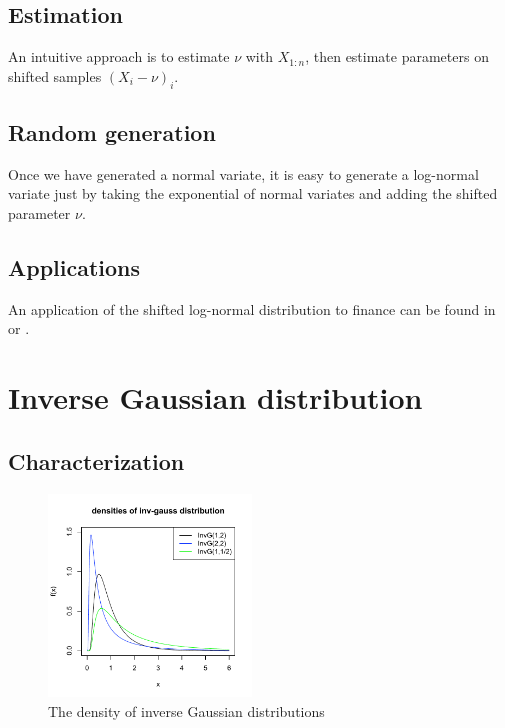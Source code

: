 \subsection{Estimation}
An intuitive approach is to estimate $\nu$ with $X_{1:n}$, then estimate parameters on shifted samples $(X_i-\nu)_i$.

\subsection{Random generation}
Once we have generated a normal variate, it is easy to generate a log-normal variate just by taking the exponential of normal variates and adding the shifted parameter $\nu$.

\subsection{Applications}
An application of the shifted log-normal distribution to finance can be found in \cite{haahtela} or
\cite{brigo}.

\section{Inverse Gaussian distribution}
\subsection{Characterization}

\begin{figure}
  \vspace{-30pt}
  \begin{center}
    \includegraphics[width=0.48\textwidth]{img/invgaussdistrzoom}
  \end{center}
  \vspace{-20pt}
  \caption{The density of inverse Gaussian distributions}
  \vspace{-20pt}
\end{figure}

